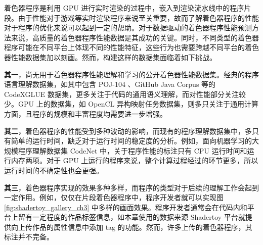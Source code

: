 {\added 着色器程序是利用 GPU 进行实时渲染的过程中，嵌入到渲染流水线中的程序片段。由于性能对于游戏等实时渲染程序来说至关重要，故而了解着色器程序的性能对于程序的优化来说可以起到一定的帮助。对于数据驱动的着色器程序性能预测方法来说，高质量的着色器程序性能数据是其成功的关键。同时，不同类型的着色器程序可能在不同平台上体现不同的性能特征，这些行为也需要跨越不同平台的着色器性能数据集加以刻画。然而，构建这样的数据集面临着如下挑战。

{\bf 其一}，尚无用于着色器程序性能理解和学习的公开着色器性能数据集。经典的程序语言理解数据集，如其中包含 POJ-104 \cite{10.5555/3015812.3016002}、GitHub Java Corpus 等的 CodeXGLUE 数据集\cite{DBLP:journals/corr/abs-2102-04664}，更多关注于代码的通用语义理解，而对性能部分关注较少。GPU 上的数据集，如 OpenCL 异构映射任务数据集\cite{8091247}，则多只关注于通用计算方面，且程序的规模和丰富程度均需要进一步增强。

{\bf 其二}，着色器程序的性能受到多种波动的影响，而现有的程序理解数据集中，多只有简单的运行时间，缺乏对于运行时间的稳定度的分析。例如，面向机器学习的大规模程序理解数据集 CodeNet \cite{DBLP:journals/corr/abs-2105-12655} 中，关于程序性能的标注只有 CPU 运行时间和运行内存两项。对于 GPU 上运行的程序来说，整个计算过程经过的环节更多，所以运行时间的不确定性也会更强。

{\bf 其三}，着色器程序实现的效果多种多样，而程序的类型对于后续的理解工作会起到一定作用。例如，仅仅在片段着色器程序中，程序开发者就可以实现图 \ref{fig:shadertoy_gallery_ch3} 中多样的画面效果。程序开发者通常会在代码内和平台上留有一定程度的作品标签信息，如本章使用的数据来源 Shadertoy 平台就提供向上传作品的属性信息中添加 tag 的功能。然而，许多上传的着色器程序，其标注并不完备。

}
